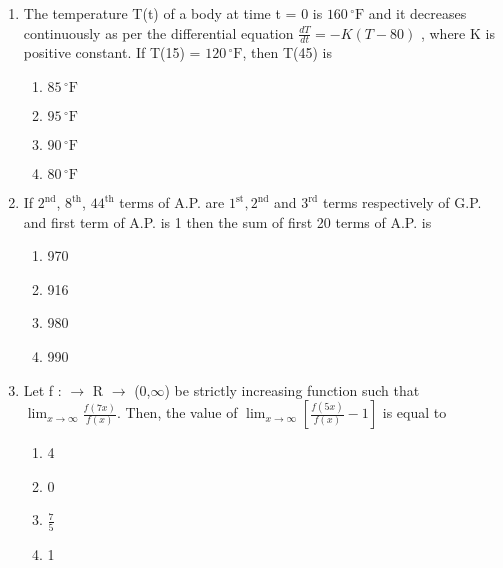 \documentclass[journal]{IEEEtran}
\numberwithin{equation}{enumi}
\numberwithin{figure}{enumi}
\begin{document}
\begin{enumerate}
\begin{multicols}{4}
    \begin{enumerate}
        \item $\frac{385}{8}$
        \item $\frac{347}{8}$
        \item $\frac{512}{25}$
        \item $\frac{656}{25}$
    \end{enumerate} 
    \end{multicols}
    \bigskip
    \item The temperature T(t) of a body at time t = 0 is $160\,^{\circ}\mathrm{F}$
    and it decreases continuously as per the differential equation $\frac{dT}{dt} = -K(T - 80)$ , where K is positive constant. If T(15) = $120\,^{\circ}\mathrm{F}$, then T(45) is 
    \begin{enumerate}
        \item $85\,^{\circ}\mathrm{F}$
        \item $95\,^{\circ}\mathrm{F}$
        \item $90\,^{\circ}\mathrm{F}$
        \item $80\,^{\circ}\mathrm{F}$
    \end{enumerate}
    \bigskip
    \item If $2^{\text{nd}}$, $8^{\text{th}}$, $44^{\text{th}}$ terms of A.P. are $1^{\text{st}},2^{\text{nd}}$ and $3^{\text{rd}}$ terms respectively of G.P. and first term of A.P. is 1 then the sum of first 20 terms of A.P. is  
    \begin{multicols}{4}
    \begin{enumerate}
        \item 970
        \item 916
        \item 980
        \item 990
    \end{enumerate} 
    \end{multicols}
    \bigskip
    \item Let f : $\rightarrow$ R $\rightarrow$ (0,$\infty$)  be strictly increasing function such that $\lim_{x \to \infty} \frac{f(7x)}{f(x)}$. Then, the value of $\lim_{x \to \infty} \left[\frac{f(5x)}{f(x)} - 1\right]$ is equal to 
    \begin{multicols}{4}
    \begin{enumerate}
        \item 4
        \item 0
        \item $\frac{7}{5}$
        \item 1

\end{enumerate}
\end{multicols}
\end{enumerate}
\end{document}
